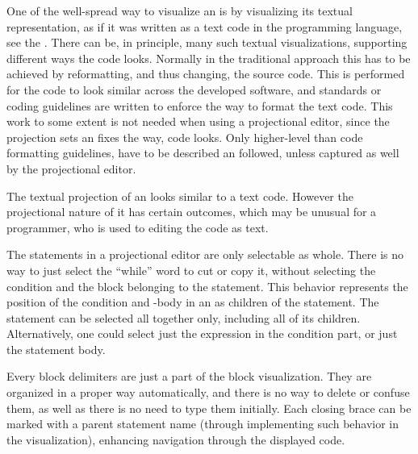 One of the well-spread way to visualize an  is by visualizing its textual representation, as if
it was written as a text code in the programming language, see the . There can be, in  
principle, many such textual visualizations, supporting different ways the code looks. Normally in 
the traditional approach this has to be achieved by reformatting, and thus changing, the source code.
This is performed for the code to look similar across the developed software, and standards or coding 
guidelines are written to enforce the way to format the text code. This work to some extent is not needed when using a projectional
editor, since the projection sets an fixes the way, code looks. Only higher-level than code formatting guidelines, 
have to be described an followed, unless captured as well by the projectional editor.



The textual projection of an  looks similar to a text code. However the projectional 
nature of it has certain outcomes, which may be unusual for a programmer, who is used to editing
the code as text.

The statements in a projectional editor are only selectable as whole. There is no way to just select 
the ``while'' word to cut or copy it, without selecting the condition and the block belonging to the statement. 
This behavior represents the position of the condition and -body in an  as children of the  
statement. The statement can be selected all together only, including all of its children. Alternatively, one could 
select just the expression in the condition part, or just the  statement body.

Every block delimiters are just a part of the block visualization. They are organized in a proper way
automatically, and there is no way to delete or confuse them, as well as there is no need to type them initially. Each
closing brace can be marked with a parent statement name (through implementing such behavior in the
 visualization), enhancing navigation through the displayed code.

% 


